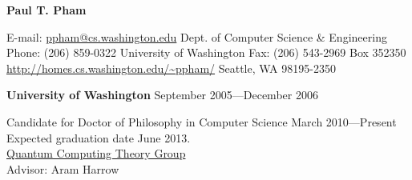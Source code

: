 \documentclass[letter]{article}
\begin{document}
\thispagestyle{empty}           %

\reversemarginpar		%

{\LARGE {\bf Paul T. Pham}}
\par
\vspace{.25in}
E-mail: \href{mailto:ppham@cs.washington.edu}{ppham@cs.washington.edu}
\hspace*{\fill}
Dept. of Computer Science \& Engineering
\linebreak
Phone: (206) 859-0322
\hspace*{\fill}
University of Washington
\linebreak
Fax: (206) 543-2969
\hspace*{\fill}
Box 352350
\linebreak
\url{http://homes.cs.washington.edu/~ppham/}
\hspace*{\fill}
Seattle, WA 98195-2350

\par
\vspace{.25in}

{\bf University of Washington} \hspace*{\fill}September 2005---December 2006
\par
Candidate for Doctor of Philosophy in Computer Science \hspace*{\fill}March 2010---Present\\
Expected graduation date June 2013.\\
\href{http://quantum.cs.washington.edu}{Quantum Computing Theory Group}\\
Advisor: Aram Harrow
\vspace{\baselineskip}
\par
\end{document}
